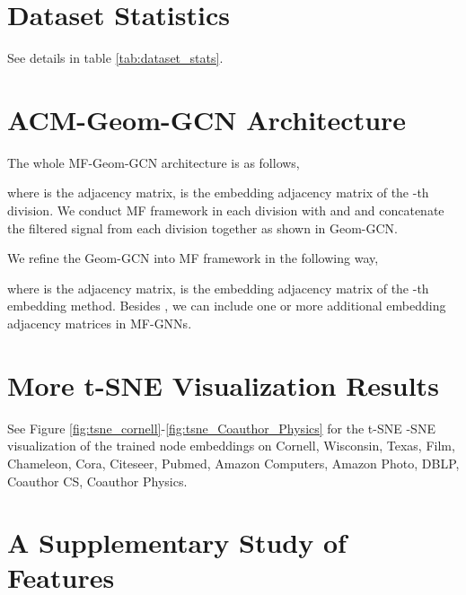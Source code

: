 \documentclass{article}
\newcommand{\0}{{\boldsymbol{0}}}
\newcommand{\6}{{\partial}}
\newcommand{\8}{{\infty}}
\newcommand{\4}{{\nabla}}
\begin{document}

\section{Dataset Statistics}
See details in table \ref{tab:dataset_stats}.
\label{appendix:dataset_stats}

\section{ACM-Geom-GCN Architecture}
\label{appendix:mfgeomgcn}
The whole MF-Geom-GCN architecture is as follows,

where  is the adjacency matrix,  is the embedding adjacency matrix of the -th division.
We conduct MF framework in each division with  and  and concatenate the filtered signal from each division together as shown in Geom-GCN.

We refine the Geom-GCN into MF framework in the following way,

where  is the adjacency matrix,  is the embedding adjacency matrix of the -th embedding method. Besides , we can include one or more additional embedding adjacency matrices  in MF-GNNs.

\section{More t-SNE Visualization Results}
See Figure \ref{fig:tsne_cornell}-\ref{fig:tsne_Coauthor_Physics} for the t-SNE -SNE visualization of the trained node embeddings on Cornell, Wisconsin, Texas, Film, Chameleon, Cora, Citeseer, Pubmed, Amazon Computers, Amazon Photo, DBLP, Coauthor CS, Coauthor Physics.


\section{A Supplementary Study of Features}
\end{document}

